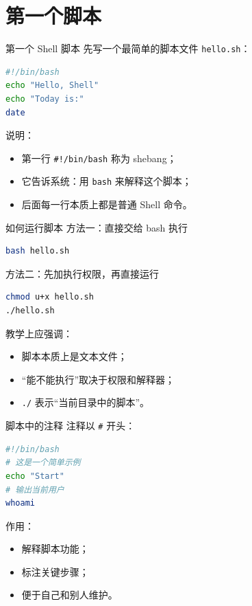 \documentclass[aspectratio=169]{beamer}
\begin{document}
\section{第一个脚本}

\begin{frame}[fragile]{第一个 Shell 脚本}
先写一个最简单的脚本文件 \texttt{hello.sh}：

\begin{lstlisting}[language=bash]
#!/bin/bash
echo "Hello, Shell"
echo "Today is:"
date
\end{lstlisting}

说明：
\begin{itemize}
  \item 第一行 \texttt{\#!/bin/bash} 称为 shebang；
  \item 它告诉系统：用 \texttt{bash} 来解释这个脚本；
  \item 后面每一行本质上都是普通 Shell 命令。
\end{itemize}
\end{frame}

\begin{frame}[fragile]{如何运行脚本}
方法一：直接交给 bash 执行
\begin{lstlisting}[language=bash]
bash hello.sh
\end{lstlisting}

方法二：先加执行权限，再直接运行
\begin{lstlisting}[language=bash]
chmod u+x hello.sh
./hello.sh
\end{lstlisting}

教学上应强调：
\begin{itemize}
  \item 脚本本质上是文本文件；
  \item “能不能执行”取决于权限和解释器；
  \item \texttt{./} 表示“当前目录中的脚本”。
\end{itemize}
\end{frame}

\begin{frame}[fragile]{脚本中的注释}
注释以 \texttt{\#} 开头：

\begin{lstlisting}[language=bash]
#!/bin/bash
# 这是一个简单示例
echo "Start"
# 输出当前用户
whoami
\end{lstlisting}

作用：
\begin{itemize}
  \item 解释脚本功能；
  \item 标注关键步骤；
  \item 便于自己和别人维护。
\end{itemize}
\end{frame}
\end{document}
